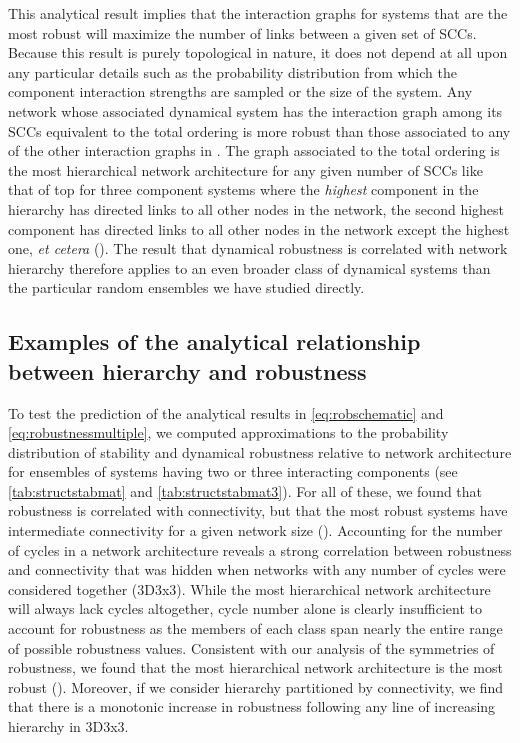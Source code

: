 This analytical result implies that the interaction graphs for systems that are the most robust will maximize the number of links between a given set of SCCs. Because this result is purely topological in nature, it does not depend at all upon any particular details such as the probability distribution from which the component interaction strengths are sampled or the size of the system. Any network whose associated dynamical system has the interaction graph among its SCCs equivalent to the total ordering is more robust than those associated to any of the other interaction graphs in . The graph associated to the total ordering is the most hierarchical network architecture for any given number of SCCs like that of  top for three component systems where the \emph{highest} component in the hierarchy has directed links to all other nodes in the network, the second highest component has directed links to all other nodes in the network except the highest one, \emph{et cetera} (). The result that dynamical robustness is correlated with network hierarchy therefore applies to an even broader class of dynamical systems than the particular random ensembles we have studied directly.

\subsection{Examples of the analytical relationship between hierarchy and robustness}

To test the prediction of the analytical results in \ref{eq:robschematic} and \ref{eq:robustnessmultiple}, we computed approximations to the probability distribution of stability and dynamical robustness relative to network architecture for ensembles of systems having two or three interacting components (see  \ref{tab:structstabmat} and \ref{tab:structstabmat3}). For all of these, we found that robustness is correlated with connectivity, but that the most robust systems have intermediate connectivity for a given network size (). Accounting for the number of cycles in a network architecture reveals a strong correlation between robustness and connectivity that was hidden when networks with any number of cycles were considered together (3D3x3). While the most hierarchical network architecture will always lack cycles altogether, cycle number alone is clearly insufficient to account for robustness as the members of each class span nearly the entire range of possible robustness values. Consistent with our analysis of the symmetries of robustness, we found that the most hierarchical network architecture is the most robust (). Moreover, if we consider hierarchy partitioned by connectivity, we find that there is a monotonic increase in robustness following any line of increasing hierarchy in 3D3x3.

